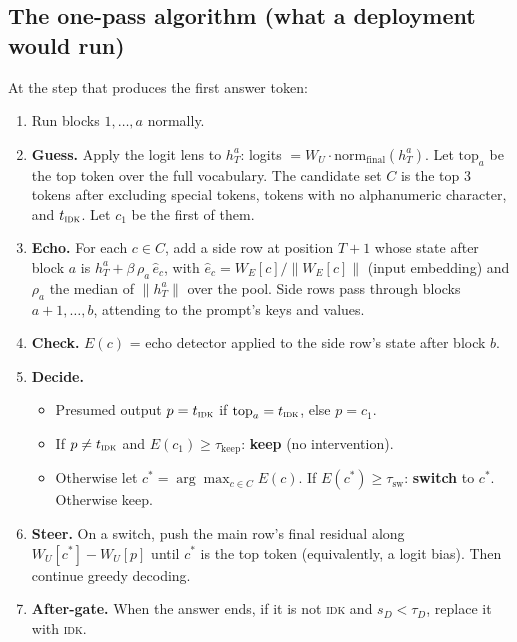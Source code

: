 \documentclass[11pt]{article}
\newcommand{\IDK}{\textsc{idk}}
\newcommand{\sD}{s_{D}}
\begin{document}
\subsection{The one-pass algorithm (what a deployment would run)}
At the step that produces the first answer token:
\begin{enumerate}
  \item Run blocks $1, \dots, a$ normally.
  \item \textbf{Guess.} Apply the logit lens to $h^a_T$: logits $= W_U \cdot \mathrm{norm}_{\mathrm{final}}(h^a_T)$.
        Let $\mathrm{top}_a$ be the top token over the full vocabulary. The candidate set $C$ is the top 3
        tokens after excluding special tokens, tokens with no alphanumeric character, and $t_{\IDK}$.
        Let $c_1$ be the first of them.
  \item \textbf{Echo.} For each $c \in C$, add a side row at position $T{+}1$ whose state after block $a$ is
        $h^a_T + \beta\,\rho_a\,\hat e_c$, with $\hat e_c = W_E[c] / \lVert W_E[c] \rVert$ (input embedding)
        and $\rho_a$ the median of $\lVert h^a_T \rVert$ over the pool. Side rows pass through blocks
        $a{+}1, \dots, b$, attending to the prompt's keys and values.
  \item \textbf{Check.} $E(c)$ = echo detector applied to the side row's state after block $b$.
  \item \textbf{Decide.}
  \begin{itemize}
    \item Presumed output $p = t_{\IDK}$ if $\mathrm{top}_a = t_{\IDK}$, else $p = c_1$.
    \item If $p \ne t_{\IDK}$ and $E(c_1) \ge \tau_{\mathrm{keep}}$: \textbf{keep} (no intervention).
    \item Otherwise let $c^* = \arg\max_{c \in C} E(c)$. If $E(c^*) \ge \tau_{\mathrm{sw}}$:
          \textbf{switch} to $c^*$. Otherwise keep.
  \end{itemize}
  \item \textbf{Steer.} On a switch, push the main row's final residual along $W_U[c^*] - W_U[p]$ until
        $c^*$ is the top token (equivalently, a logit bias). Then continue greedy decoding.
  \item \textbf{After-gate.} When the answer ends, if it is not \IDK{} and $\sD < \tau_D$, replace it with \IDK.
\end{enumerate}
\end{document}

